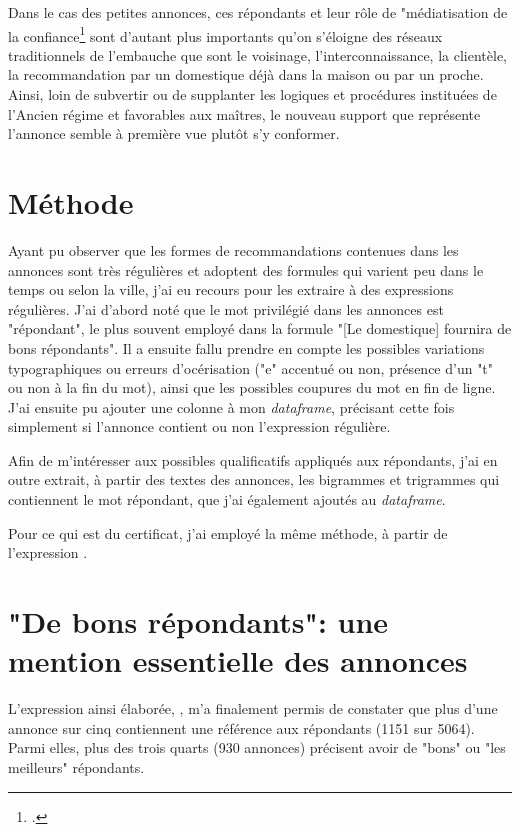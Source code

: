 Dans le cas des petites annonces, ces répondants et leur rôle de "médiatisation de la confiance\footcites{kramplAdresserClercHuissier2017} sont d'autant plus importants qu'on s'éloigne des réseaux traditionnels de l'embauche que sont le voisinage, l'interconnaissance, la clientèle, la recommandation par un domestique déjà dans la maison ou par un proche. Ainsi, loin de subvertir ou de supplanter les logiques et procédures instituées de l'Ancien régime et favorables aux maîtres, le nouveau support que représente l'annonce semble à première vue plutôt s'y conformer.



\section{Méthode}

Ayant pu observer que les formes de recommandations contenues dans les annonces sont très régulières et adoptent des formules qui varient peu dans le temps ou selon la ville, j'ai eu recours pour les extraire à des expressions régulières. J'ai d'abord noté que le mot privilégié dans les annonces est "répondant", le plus souvent employé dans la formule "[Le domestique] fournira de bons répondants". Il a ensuite fallu prendre en compte les possibles variations typographiques ou erreurs d'océrisation ("e" accentué ou non, présence d'un "t" ou non à la fin du mot), ainsi que les possibles coupures du mot en fin de ligne. J'ai ensuite pu ajouter une colonne à mon \textit{dataframe}, précisant cette fois simplement si l'annonce contient ou non l'expression régulière.

Afin de m'intéresser aux possibles qualificatifs appliqués aux répondants, j'ai en outre extrait, à partir des textes des annonces, les bigrammes et trigrammes qui contiennent le mot répondant, que j'ai également ajoutés au \textit{dataframe}.

Pour ce qui est du certificat, j'ai employé la même méthode, à partir de l'expression .


\section{"De bons répondants": une mention essentielle des annonces}

L'expression ainsi élaborée, , m'a finalement permis de constater que plus d'une annonce sur cinq contiennent une référence aux répondants (1151 sur 5064). Parmi elles, plus des trois quarts (930 annonces) précisent avoir de "bons" ou "les meilleurs" répondants. 


